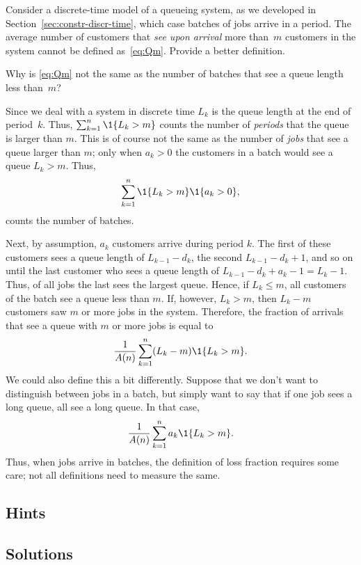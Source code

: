 \begin{exercise}
  Consider a discrete-time model of a queueing system, as we developed
  in Section~\ref{sec:constr-discr-time}, which case  batches of
  jobs arrive in a period.  The average number of customers
  that \emph{see upon arrival} more than~$m$ customers in the system
  cannot be defined as~\eqref{eq:Qm}. Provide a better definition. 
  \begin{hint}
Why is \eqref{eq:Qm} not the same as the number of
  batches that see a queue length less than~$m$?
  \end{hint}
  \begin{solution} Since we deal with a system in discrete time $L_k$
    is the queue length at the end of period~$k$. Thus,
    $\sum_{k=1}^n \1{L_k > m}$ counts the number of \emph{periods}
    that the queue is larger than $m$. This is of course not the same
    as the number of \emph{jobs} that see a queue larger than $m$;
    only when $a_k>0$ the customers in a batch would see a queue
    $L_k>m$. Thus,
    \begin{equation*}
      \sum_{k=1}^n \1{L_k > m} \1{a_k > 0},
    \end{equation*}
    counts the number of batches. 

    Next, by assumption, $a_k$ customers arrive during period $k$. The
    first of these customers sees a queue length of $L_{k-1} - d_k$,
    the second $L_{k-1}-d_k + 1$, and so on until the last customer
    who sees a queue length of $L_{k-1} - d_k + a_k -1 = L_k
    -1$.
    Thus, of all jobs the last sees the largest queue. Hence, if
    $L_k \leq m$, all customers of the batch see a queue less than
    $m$. If, however, $L_k > m$, then $L_k -m$ customers saw $m$ or
    more jobs in the system. Therefore, the fraction of arrivals that
    see a queue with $m$ or more jobs is equal to
\begin{equation*}
  \frac 1 {A(n)} \sum_{k=1}^n (L_k - m) \1{L_k > m} .
\end{equation*}
We could also define this a bit differently. Suppose that we don't
want to distinguish between jobs in a batch, but simply want to say
that if one job sees a long queue, all see a long queue. In that case,
\begin{equation*}
\frac 1{A(n)}\sum_{k=1}^n a_k \1{L_k > m}.
\end{equation*}
Thus, when jobs arrive in batches, the definition of loss fraction
requires some care; not all definitions need to measure the same.
  \end{solution}
\end{exercise}



\subsection*{Hints}

\subsection*{Solutions}

\clearpage
  




